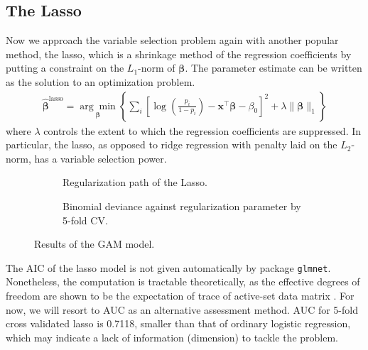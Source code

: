 \subsection{The Lasso}
Now we approach the variable selection problem again with another popular method, the lasso, which is a shrinkage method of the regression coefficients by putting a constraint on the $L_1$-norm of $\boldsymbol{\beta}$. The parameter estimate can be written as the solution to an optimization problem.
\begin{align}
\widehat{\boldsymbol{\beta}}^{\text{lasso}}=\underset{\boldsymbol{\beta}}{\arg\min}\left\{\sum_i\left[\log\left(\frac{p_i}{1-p_i}\right)-\mathbf{x}^\top\boldsymbol{\beta}-\beta_0\right]^2+\lambda\|\boldsymbol{\beta}\|_1\right\}
\end{align}
where $\lambda$ controls the extent to which the regression coefficients are suppressed. In particular, the lasso, as opposed to ridge regression with penalty laid on the $L_2$-norm, has a variable selection power.

\begin{figure}[htpb]
  \centering
    \begin{subfigure}{.5\textwidth} \centering
	
	\caption{Regularization path of the Lasso.}
    \end{subfigure}%
    \begin{subfigure}{.5\textwidth} \centering
	
	\caption{Binomial deviance against regularization parameter by 5-fold CV.}
    \end{subfigure}
    \caption{Results of the GAM model.}
\end{figure}

\par The AIC of the lasso model is not given automatically by package \texttt{glmnet}. Nonetheless, the computation is tractable theoretically, as the effective degrees of freedom are shown to be the expectation of trace of active-set data matrix \cite{tibshirani:2012:dflasso}. For now, we will resort to AUC as an alternative assessment method. AUC for 5-fold cross validated lasso is 0.7118, smaller than that of ordinary logistic regression, which may indicate a lack of information (dimension) to tackle the problem.

